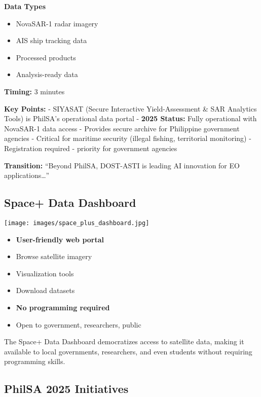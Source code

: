 \documentclass[
  letterpaper,
  DIV=11,
  numbers=noendperiod]{scrartcl}
\providecommand{\tightlist}{%
  \setlength{\itemsep}{0pt}\setlength{\parskip}{0pt}}
\begin{document}
\textbf{Data Types}

\begin{itemize}
\tightlist
\item
  NovaSAR-1 radar imagery
\item
  AIS ship tracking data
\item
  Processed products
\item
  Analysis-ready data
\end{itemize}

\textbf{Timing:} 3 minutes

\textbf{Key Points:} - SIYASAT (Secure Interactive Yield-Assessment \&
SAR Analytics Tools) is PhilSA's operational data portal - \textbf{2025
Status:} Fully operational with NovaSAR-1 data access - Provides secure
archive for Philippine government agencies - Critical for maritime
security (illegal fishing, territorial monitoring) - Registration
required - priority for government agencies

\textbf{Transition:} ``Beyond PhilSA, DOST-ASTI is leading AI innovation
for EO applications\ldots{}''

\subsection{Space+ Data Dashboard}\label{space-data-dashboard}

\begin{center}
\texttt{[image: images/space\_plus\_dashboard.jpg]}
\end{center}

\begin{itemize}
\tightlist
\item
  \textbf{User-friendly web portal}
\item
  Browse satellite imagery
\item
  Visualization tools
\item
  Download datasets
\item
  \textbf{No programming required}
\item
  Open to government, researchers, public
\end{itemize}

The Space+ Data Dashboard democratizes access to satellite data, making
it available to local governments, researchers, and even students
without requiring programming skills.

\subsection{PhilSA 2025 Initiatives}\label{philsa-2025-initiatives}
\end{document}
